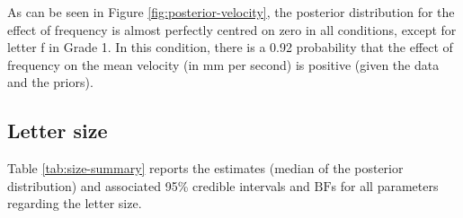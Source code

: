 \documentclass[
  11pt,
  english,
  ,doc,mask,floatsintext]{apa6}
\begin{document}
As can be seen in Figure \ref{fig:posterior-velocity}, the posterior distribution for the effect of frequency is almost perfectly centred on zero in all conditions, except for letter f in Grade 1. In this condition, there is a 0.92 probability that the effect of frequency on the mean velocity (in mm per second) is positive (given the data and the priors).

\hypertarget{letter-size}{%
\subsection{Letter size}\label{letter-size}}

Table \ref{tab:size-summary} reports the estimates (median of the posterior distribution) and associated 95\% credible intervals and \(\text{BF}\)s for all parameters regarding the letter size.
\end{document}
